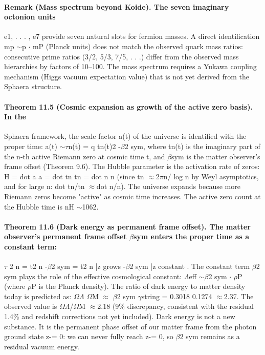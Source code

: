 \documentclass[12pt,a4paper]{article}
\begin{document}
\paragraph*{Remark (Mass spectrum beyond Koide). The seven imaginary octonion units}
e1, . . . , e7 provide seven natural slots for fermion masses. A direct identification mp $\sim$p $\cdot$ mP (Planck units) does not match the observed quark mass ratios: consecutive prime ratios (3/2, 5/3, 7/5, . . .) differ from the observed mass hierarchies by factors of 10--100. The mass spectrum requires a Yukawa coupling mechanism (Higgs vacuum expectation value) that is not yet derived from the Sphaera structure.
\paragraph*{Theorem 11.5 (Cosmic expansion as growth of the active zero basis). In the}
Sphaera framework, the scale factor a(t) of the universe is identified with the proper time: a(t) $\sim$$\tau$n(t) = q tn(t)2 -$\beta$2 sym, where tn(t) is the imaginary part of the n-th active Riemann zero at cosmic time t, and $\beta$sym is the matter observer's frame offset (Theorem 9.6). The Hubble parameter is the activation rate of zeros: H = dot a a = dot tn tn = dot n n (since tn $\approx$2$\pi$n/ log n by Weyl asymptotics, and for large n: dot tn/tn $\approx$dot n/n). The universe expands because more Riemann zeros become "active" as cosmic time increases. The active zero count at the Hubble time is nH $\sim$1062.
\paragraph*{Theorem 11.6 (Dark energy as permanent frame offset). The matter observer's permanent frame offset $\beta$sym enters the proper time as a constant term:}
$\tau$ 2 n = t2 n -$\beta$2 sym = t2 n |{z} grows -$\beta$2 sym |{z} constant . The constant term $\beta$2 sym plays the role of the effective cosmological constant: $\Lambda$eff $\sim$$\beta$2 sym $\cdot$ $\rho$P (where $\rho$P is the Planck density). The ratio of dark energy to matter density today is predicted as: $\Omega$$\Lambda$ $\Omega$M $\approx$ $\beta$2 sym $\gamma$string = 0.3018
0.1274 $\approx$2.37.
The observed value is $\Omega$$\Lambda$/$\Omega$M $\approx$2.18 (9\% discrepancy, consistent with the residual 1.4\% and redshift corrections not yet included).
Dark energy is not a new substance. It is the permanent phase offset of our matter frame from the photon ground state z-= 0: we can never fully reach z-= 0, so $\beta$2 sym remains as a residual vacuum energy.
\end{document}
